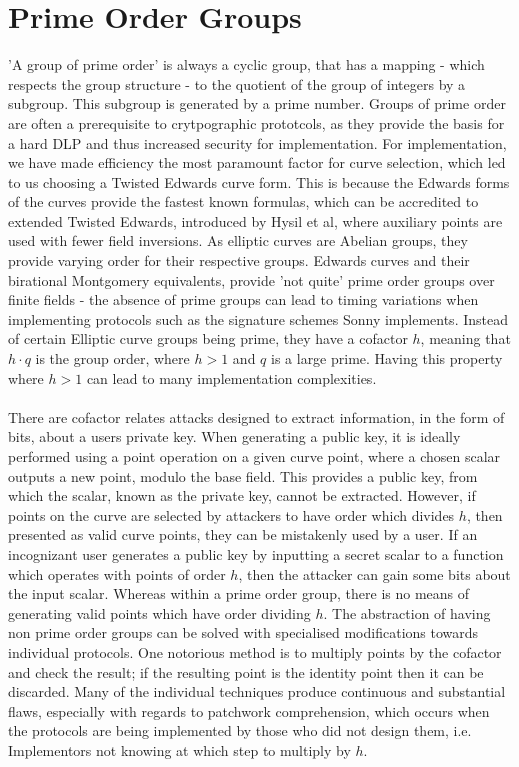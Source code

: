 \documentclass{article}
\theoremstyle{definition}
\theoremstyle{remark}
\begin{document}
	\section{Prime Order Groups}
	
	'A group of prime order' is always a cyclic group, that has a mapping - which respects the group structure - to the quotient of the group of integers by a subgroup. This subgroup is generated by a prime number. Groups of prime order are often a prerequisite to crytpographic prototcols, as they provide the basis for a hard DLP and thus increased security for implementation. For implementation, we have made efficiency the most paramount factor for curve selection, which led to us choosing a Twisted Edwards curve form. This is because the Edwards forms of the curves provide the fastest known formulas, which can be accredited to extended Twisted Edwards, introduced by Hysil et al, where auxiliary points are used with fewer field inversions. As elliptic curves are Abelian groups, they provide varying order for their respective groups. Edwards curves and their birational Montgomery equivalents, provide 'not quite' prime order groups over finite fields - the absence of prime groups can lead to timing variations when implementing protocols such as the signature schemes Sonny implements. Instead of certain Elliptic curve groups being prime, they have a cofactor $h$, meaning that $h \cdot q$ is the group order, where $h > 1$ and $q$ is a large prime. Having this property where $h > 1$ can lead to many implementation complexities.\\\\
	
	There are cofactor relates attacks designed to extract information, in the form of bits, about a users private key. When generating a public key, it is ideally performed using a point operation on a given curve point, where a chosen scalar outputs a new point, modulo the base field. This provides a public key, from which the scalar, known as the private key, cannot be extracted. However, if points on the curve are selected by attackers to have order which divides $h$, then presented as valid curve points, they can be mistakenly used by a user. If an incognizant user generates a public key by inputting a secret scalar to a function which operates with points of order $h$, then the attacker can gain some bits about the input scalar. Whereas within a prime order group, there is no means of generating valid points which have order dividing $h$. The abstraction of having non prime order groups can be solved with specialised modifications towards individual protocols. One notorious method is to multiply points by the cofactor and check the result; if the resulting point is the identity point then it can be discarded. Many of the individual techniques produce continuous and substantial flaws, especially with regards to patchwork comprehension, which occurs when the protocols are being implemented by those who did not design them, i.e. Implementors not knowing at which step to multiply by $h$. 
	
\end{document}
